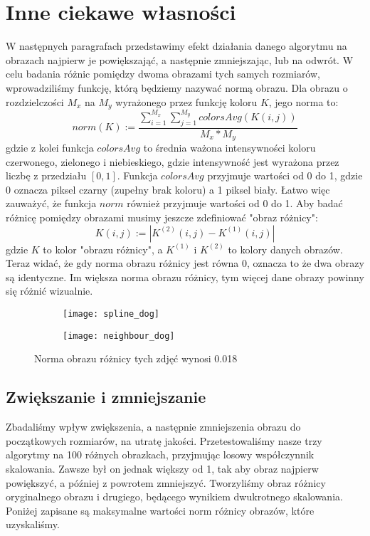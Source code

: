 \documentclass{mwart}
\theoremstyle{definition}
\begin{document}
\section{Inne ciekawe własności}
W następnych paragrafach przedstawimy efekt działania danego algorytmu na obrazach najpierw je powiększająć, a następnie zmniejszając, lub na odwrót. W celu badania różnic pomiędzy dwoma obrazami tych samych rozmiarów, wprowadziliśmy funkcję, którą będziemy nazywać normą obrazu. Dla obrazu o rozdzielczości $M_x$ na $M_y$ wyrażonego przez funkcję koloru $K$, jego norma to:
$$norm(K) := \dfrac{\sum_{i=1}^{M_x} \sum_{j=1}^{M_y} colorsAvg(K(i,j))}{M_x * M_y}$$
gdzie z kolei funkcja $colorsAvg$ to średnia ważona intensywności koloru czerwonego, zielonego i niebieskiego, gdzie intensywność jest wyrażona przez liczbę z przedziału $[0, 1]$. Funkcja $colorsAvg$ przyjmuje wartości od 0 do 1, gdzie 0 oznacza piksel czarny (zupełny brak koloru) a 1 piksel biały. Łatwo więc zauważyć, że funkcja $norm$ również przyjmuje wartości od 0 do 1.
Aby badać różnicę pomiędzy obrazami musimy jeszcze zdefiniować "obraz różnicy":
$$K(i, j) := |K^{(2)}(i,j) - K^{(1)}(i,j)| $$
gdzie $K$ to kolor "obrazu różnicy", a $K^{(1)}$ i $K^{(2)}$ to kolory danych obrazów. Teraz widać, że gdy norma obrazu różnicy jest równa 0, oznacza to że dwa obrazy są identyczne. Im większa norma obrazu różnicy, tym więcej dane obrazy powinny się różnić wizualnie.

\begin{figure}[!h]
  \begin{subfigure}[b]{0.4\textwidth}
    \texttt{[image: spline\_dog]}
    \label{fig:f1}
  \end{subfigure}
  \hfill
  \begin{subfigure}[b]{0.49\textwidth}
    \texttt{[image: neighbour\_dog]}
    \label{fig:f2}
  \end{subfigure}
  \caption*{Norma obrazu różnicy tych zdjęć wynosi 0.018}
\end{figure}

\subsection{Zwiększanie i zmniejszanie}
Zbadaliśmy wpływ zwiększenia, a następnie zmniejszenia obrazu do początkowych rozmiarów, na utratę jakości. Przetestowaliśmy nasze trzy algorytmy na 100 różnych obrazkach, przyjmując losowy współczynnik skalowania. Zawsze był on jednak większy od 1, tak aby obraz najpierw powiększyć, a później z powrotem zmniejszyć. Tworzyliśmy obraz różnicy oryginalnego obrazu i drugiego, będącego wynikiem dwukrotnego skalowania. Poniżej zapisane są maksymalne wartości norm różnicy obrazów, które uzyskaliśmy. \\
\end{document}
